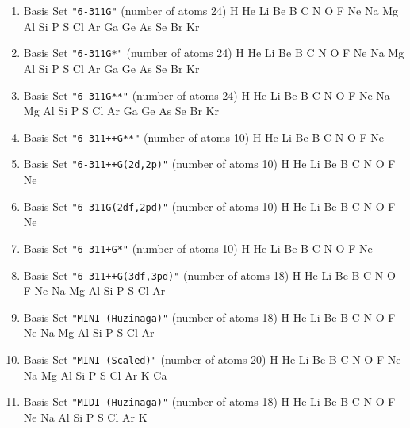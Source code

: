 \begin{enumerate}
\item Basis Set \verb#"6-311G"# (number of atoms 24)  \newline 
  H He Li Be B C N O F Ne Na Mg Al Si P S Cl Ar Ga Ge As Se Br Kr


\item Basis Set \verb#"6-311G*"# (number of atoms 24)  \newline 
  H He Li Be B C N O F Ne Na Mg Al Si P S Cl Ar Ga Ge As Se Br Kr


\item Basis Set \verb#"6-311G**"# (number of atoms 24)  \newline 
  H He Li Be B C N O F Ne Na Mg Al Si P S Cl Ar Ga Ge As Se Br Kr


\item Basis Set \verb#"6-311++G**"# (number of atoms 10)  \newline 
  H He Li Be B C N O F Ne


\item Basis Set \verb#"6-311++G(2d,2p)"# (number of atoms 10)  \newline 
  H He Li Be B C N O F Ne


\item Basis Set \verb#"6-311G(2df,2pd)"# (number of atoms 10)  \newline 
  H He Li Be B C N O F Ne


\item Basis Set \verb#"6-311+G*"# (number of atoms 10)  \newline 
  H He Li Be B C N O F Ne


\item Basis Set \verb#"6-311++G(3df,3pd)"# (number of atoms 18)  \newline 
  H He Li Be B C N O F Ne Na Mg Al Si P S Cl Ar


\item Basis Set \verb#"MINI (Huzinaga)"# (number of atoms 18)  \newline 
  H He Li Be B C N O F Ne Na Mg Al Si P S Cl Ar


\item Basis Set \verb#"MINI (Scaled)"# (number of atoms 20)  \newline 
  H He Li Be B C N O F Ne Na Mg Al Si P S Cl Ar K Ca


\item Basis Set \verb#"MIDI (Huzinaga)"# (number of atoms 18)  \newline 
  H He Li Be B C N O F Ne Na Al Si P S Cl Ar K



\end{enumerate}
